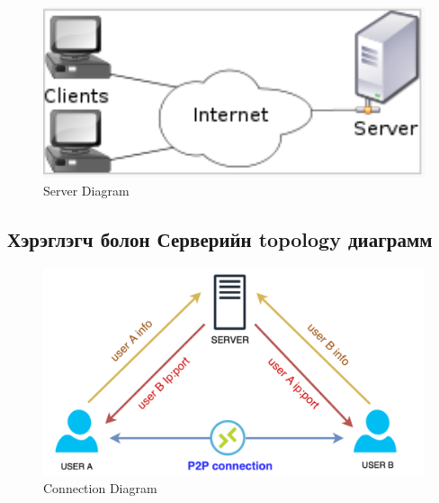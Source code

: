 	\begin{figure}
		\centering
		\includegraphics[width=13cm]{images/client-server.PNG}
		\caption{Server Diagram}
		\label{fig:form}
	\end{figure}

	\subsection{Хэрэглэгч болон Серверийн topology диаграмм}	

	\begin{figure}
		\centering
		\includegraphics[width=15cm]{images/diagram.png}
		\caption{Connection Diagram}
		\label{fig:form}
	\end{figure}
	\pagebreak

